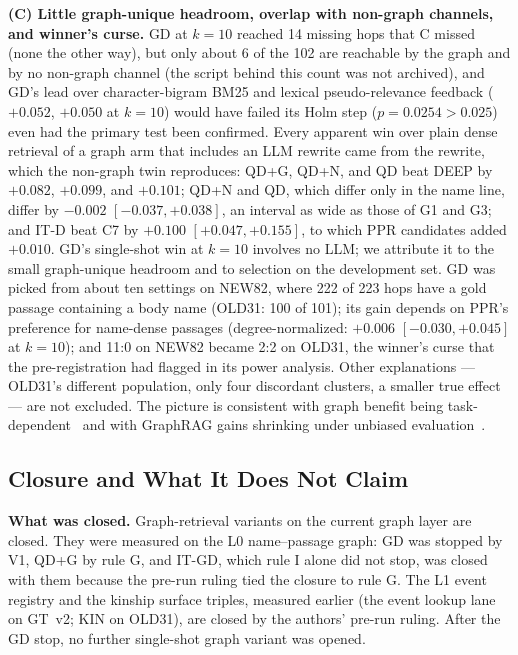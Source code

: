 \textbf{(C) Little graph-unique headroom, overlap with non-graph
channels, and winner's curse.} GD at $k=10$ reached 14 missing hops that C
missed (none the other way), but only about 6 of the 102 are reachable by
the graph and by no non-graph channel (the script behind this count was
not archived), and GD's lead over character-bigram BM25 and lexical
pseudo-relevance feedback ($+0.052$, $+0.050$ at $k=10$) would have failed
its Holm step ($p=0.0254>0.025$) even had the primary test been confirmed.
Every apparent win over plain dense retrieval of a graph arm that
includes an LLM rewrite came from the rewrite, which the non-graph twin
reproduces: QD+G, QD+N, and QD beat DEEP by $+0.082$, $+0.099$, and
$+0.101$; QD+N and QD, which differ only in the name line, differ by
$-0.002$ $[-0.037, +0.038]$, an interval as wide as those of G1 and G3;
and IT-D beat C7 by $+0.100$ $[+0.047, +0.155]$, to which PPR candidates
added $+0.010$. GD's single-shot win at $k=10$ involves no LLM; we
attribute it to the small graph-unique headroom and to selection on the
development set. GD was picked from about ten settings on NEW82, where
222 of 223 hops have a gold passage containing a body name (OLD31: 100
of 101); its gain depends on PPR's preference for name-dense passages
(degree-normalized: $+0.006$ $[-0.030, +0.045]$ at $k=10$); and 11:0 on
NEW82 became 2:2 on OLD31, the winner's curse that the pre-registration
had flagged in its power analysis. Other explanations --- OLD31's
different population, only four discordant clusters, a smaller true
effect --- are not excluded. The picture is consistent with graph benefit
being task-dependent~\cite{xiang2025whengraphs} and with GraphRAG gains
shrinking under unbiased evaluation~\cite{zeng2025unbiased}.

\subsection{Closure and What It Does Not Claim}
\label{sec:rebuiltclosure}

\textbf{What was closed.} Graph-retrieval variants on the current graph
layer are closed. They were measured on the L0 name--passage graph: GD
was stopped by V1, QD+G by rule G, and IT-GD, which rule I alone did not
stop, was closed with them because the pre-run ruling tied the closure
to rule G. The L1 event registry and the kinship surface triples,
measured earlier (the event lookup lane on GT~v2; KIN on OLD31), are
closed by the authors' pre-run ruling. After the GD stop, no further single-shot
graph variant was opened.

